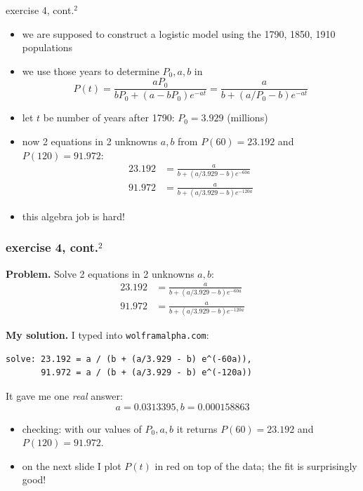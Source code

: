\documentclass[colorlinks]{beamer}
\begin{document}
\begin{frame}{exercise 4, cont.$^2$}

\begin{itemize}
\item we are supposed to construct a logistic model using the 1790, 1850, 1910 populations
\item we use those years to determine $P_0,a,b$ in
$$P(t)=\frac{aP_0}{bP_0+(a-bP_0) e^{-at}} = \frac{a}{b+(a/P_0-b) e^{-at}}$$
\item let $t$ be number of years after 1790: $P_0=3.929$ (millions)
\item now 2 equations in 2 unknowns $a,b$ from $P(60)=23.192$ and $P(120)=91.972$:
\small
\begin{align*}
23.192 &= \frac{a}{b+(a/3.929-b) e^{-60a}} \\
91.972 &= \frac{a}{b+(a/3.929-b) e^{-120a}}
\end{align*}
\normalsize
\item this algebra job is hard!
\end{itemize}
\end{frame}


\begin{frame}[fragile]

\frametitle{exercise 4, cont.$^2$}

\noindent \textbf{Problem.}  Solve 2 equations in 2 unknowns $a,b$:
\small
\begin{align*}
23.192 &= \frac{a}{b+(a/3.929-b) e^{-60a}} \\
91.972 &= \frac{a}{b+(a/3.929-b) e^{-120a}}
\end{align*}

\noindent \textbf{My solution.}  I typed into \texttt{wolframalpha.com}:

\begin{Verbatim}[fontsize=\footnotesize,xleftmargin=7mm]
solve: 23.192 = a / (b + (a/3.929 - b) e^(-60a)),
       91.972 = a / (b + (a/3.929 - b) e^(-120a))
\end{Verbatim}

It gave me one \emph{real} answer:
	$$a = 0.0313395, b = 0.000158863$$

\bigskip
\begin{itemize}
\item checking: with our values of $P_0,a,b$ it returns $P(60)=23.192$ and $P(120)=91.972$.

\item on the next slide I plot $P(t)$ in red on top of the data; the fit is surprisingly good!
\end{itemize}
\end{frame}
\end{document}
